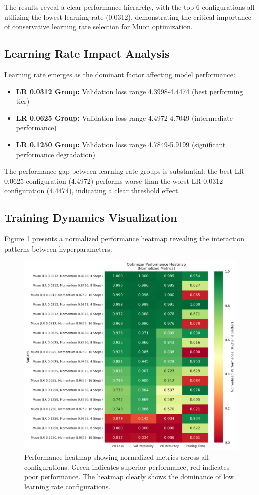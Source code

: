 \documentclass[11pt,a4paper]{article}
\begin{document}
The results reveal a clear performance hierarchy, with the top 6 configurations all utilizing the lowest learning rate (0.0312), demonstrating the critical importance of conservative learning rate selection for Muon optimization.

\subsection{Learning Rate Impact Analysis}
Learning rate emerges as the dominant factor affecting model performance:

\begin{itemize}
    \item \textbf{LR 0.0312 Group:} Validation loss range 4.3998-4.4474 (best performing tier)
    \item \textbf{LR 0.0625 Group:} Validation loss range 4.4972-4.7049 (intermediate performance)
    \item \textbf{LR 0.1250 Group:} Validation loss range 4.7849-5.9199 (significant performance degradation)
\end{itemize}

The performance gap between learning rate groups is substantial: the best LR 0.0625 configuration (4.4972) performs worse than the worst LR 0.0312 configuration (4.4474), indicating a clear threshold effect.

\subsection{Training Dynamics Visualization}
Figure \ref{fig:heatmap_analysis} presents a normalized performance heatmap revealing the interaction patterns between hyperparameters:

\begin{figure}[H]
    \centering
    \includegraphics[width=\linewidth]{images/performance_heatmap.png}
    \caption{Performance heatmap showing normalized metrics across all configurations. Green indicates superior performance, red indicates poor performance. The heatmap clearly shows the dominance of low learning rate configurations.}
    \label{fig:heatmap_analysis}
\end{figure}
\end{document}

